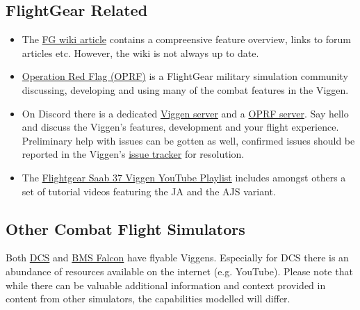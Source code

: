 \subsection{FlightGear Related}
\begin{itemize}
\item The \href{http://wiki.flightgear.org/Saab_37_Viggen}{FG wiki article} contains a compreensive feature overview, links to forum articles etc. However, the wiki is not always up to date.
\item \href{http://opredflag.com/}{Operation Red Flag (OPRF)} is a FlightGear military simulation community discussing, developing and using many of the combat features in the Viggen.
\item On Discord there is a dedicated \href{https://discord.gg/jc5pSM5}{Viggen server} and a \href{https://discord.gg/SmGFnJN}{OPRF server}. Say hello and discuss the Viggen's features, development and your flight experience. Preliminary help with issues can be gotten as well, confirmed issues should be reported in the Viggen's \href{https://github.com/NikolaiVChr/flightgear-saab-ja-37-viggen/issues}{issue tracker} for resolution.
\item The \href{https://www.youtube.com/playlist?list=PLogi97V-ki0GfCLqimTtIq9RIVcm-GRFE}{Flightgear Saab 37 Viggen YouTube Playlist} includes amongst others a set of tutorial videos featuring the JA and the AJS variant.
\end{itemize}

\subsection{Other Combat Flight Simulators}
Both \href{https://www.digitalcombatsimulator.com/en/index.php}{DCS} and \href{https://www.benchmarksims.org/}{BMS Falcon} have flyable Viggens. Especially for DCS there is an abundance of resources available on the internet (e.g. YouTube). Please note that while there can be valuable additional information and context provided in content from other simulators, the capabilities modelled will differ.

